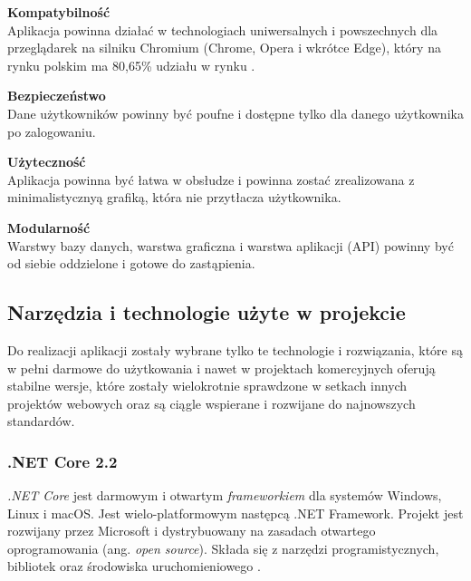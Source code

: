 \documentclass[12pt]{article}
\numberwithin{figure}{section}
\begin{document}
\begin{sloppypar}
\noindent
\textbf{Kompatybilność}\\
\indent
Aplikacja powinna działać w technologiach uniwersalnych i powszechnych dla przeglądarek na silniku Chromium (Chrome, Opera i wkrótce Edge), który na rynku polskim ma 80,65\% udziału w rynku \cite{chrome}.

\noindent
\textbf{Bezpieczeństwo}\\
\indent
Dane użytkowników powinny być poufne i dostępne tylko dla danego użytkownika po zalogowaniu.

\noindent
\textbf{Użyteczność}\\
\indent
Aplikacja powinna być łatwa w obsłudze i powinna zostać zrealizowana z minimalistycznyą grafiką, która nie przytłacza użytkownika.

\noindent
\textbf{Modularność}\\
\indent
Warstwy bazy danych, warstwa graficzna i warstwa  aplikacji (API) powinny być od siebie oddzielone i gotowe do zastąpienia.
    
\subsection{Narzędzia i technologie użyte w projekcie}
Do realizacji aplikacji zostały wybrane tylko te technologie i rozwiązania, które są w pełni darmowe do użytkowania i nawet w projektach komercyjnych oferują stabilne wersje, które zostały wielokrotnie sprawdzone w setkach innych projektów webowych oraz są ciągle wspierane i rozwijane do najnowszych standardów. 

\subsubsection{.NET Core 2.2}
\textit{.NET Core} jest darmowym i otwartym \textit{frameworkiem} dla systemów Windows, Linux i macOS. Jest wielo-platformowym następcą .NET Framework. Projekt jest rozwijany przez Microsoft i dystrybuowany na zasadach otwartego oprogramowania (ang. \textit{open source}). Składa się z narzędzi programistycznych, bibliotek oraz środowiska uruchomieniowego \cite{dotnet-core}. 
    

\end{sloppypar}
\end{document}
